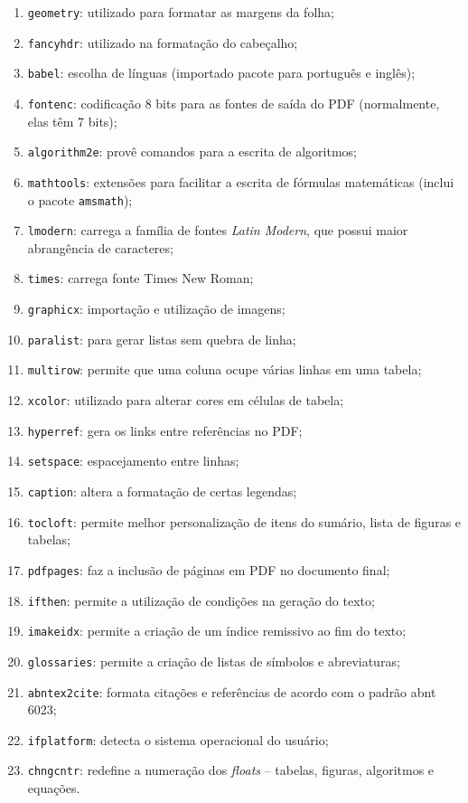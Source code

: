 \documentclass{fei}
\begin{document}
    \begin{enumerate}
        \item\texttt{geometry}: utilizado para formatar as margens da folha;
        \item\texttt{fancyhdr}: utilizado na formatação do cabeçalho;
        \item\texttt{babel}: escolha de línguas (importado pacote para português e inglês);
        \item\texttt{fontenc}: codificação 8 bits para as fontes de saída do PDF (normalmente, elas têm 7 bits);
        \item\texttt{algorithm2e}: provê comandos para a escrita de algoritmos;
        \item\texttt{mathtools}: extensões para facilitar a escrita de fórmulas matemáticas (inclui o pacote \texttt{amsmath});
        \item\texttt{lmodern}: carrega a família de fontes \emph{Latin Modern}, que possui maior abrangência de caracteres;
        \item\texttt{times}: carrega fonte Times New Roman;
        \item\texttt{graphicx}: importação e utilização de imagens;
        \item\texttt{paralist}: para gerar listas sem quebra de linha;
        \item\texttt{multirow}: permite que uma coluna ocupe várias linhas em uma tabela;
        \item\texttt{xcolor}: utilizado para alterar cores em células de tabela;
        \item\texttt{hyperref}: gera os links entre referências no PDF;
        \item\texttt{setspace}: espacejamento entre linhas;
        \item\texttt{caption}: altera a formatação de certas legendas;
        \item\texttt{tocloft}: permite melhor personalização de itens do sumário, lista de figuras e tabelas;
        \item\texttt{pdfpages}: faz a inclusão de páginas em PDF no documento final;
        \item\texttt{ifthen}: permite a utilização de condições na geração do texto;
        \item\texttt{imakeidx}: permite a criação de um índice remissivo ao fim do texto;
        \item{}\texttt{glossaries}: permite a criação de listas de símbolos e abreviaturas;
        \item\texttt{abntex2cite}: formata citações e referências de acordo com o padrão \gls{abnt} 6023;
        \item\texttt{ifplatform}: detecta o sistema operacional do usuário;
        \item\texttt{chngcntr}: redefine a numeração dos \emph{floats} -- tabelas, figuras, algoritmos e equações.
    \end{enumerate}
\end{document}
